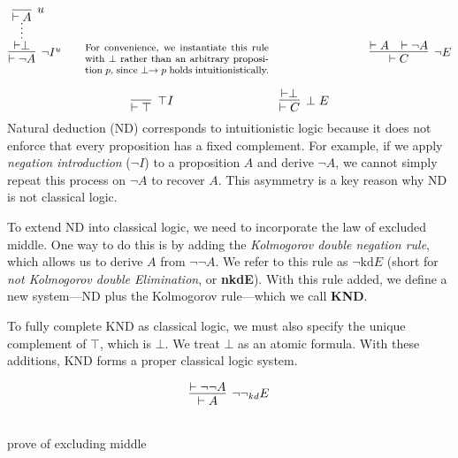 \documentclass{article}
\begin{document}
\[
\infer[\neg I^{u}]{\vdash \neg A}{
  \infer*{\vdash \perp}{\infer[u]{\vdash A}{}}
}
\qquad
\parbox{0.45\linewidth}{\footnotesize
  For convenience, we instantiate this rule with $\perp$ rather than an arbitrary proposition $p$, since $\perp \rightarrow p$ holds intuitionistically.
}
\hspace{3cm}
\infer[\neg E]{\vdash C}{
  \vdash A & \vdash \neg A
}
\]

\[
\infer[\top I]{\vdash \top}{}
\hspace{3cm}
\infer[\perp E]{\vdash C}{\vdash \perp}
\]
Natural deduction (ND) corresponds to intuitionistic logic because it does not enforce that every proposition has a fixed complement. For example, if we apply \emph{negation introduction} ($\neg I$) to a proposition $A$ and derive $\neg A$, we cannot simply repeat this process on $\neg A$ to recover $A$. This asymmetry is a key reason why ND is not classical logic.

To extend ND into classical logic, we need to incorporate the law of excluded middle. One way to do this is by adding the \emph{Kolmogorov double negation rule}, which allows us to derive $A$ from $\neg\neg A$. We refer to this rule as $\neg\text{kd}E$ (short for \emph{not Kolmogorov double Elimination}, or \textbf{nkdE}). With this rule added, we define a new system—ND plus the Kolmogorov rule—which we call \textbf{KND}.

To fully complete KND as classical logic, we must also specify the unique complement of $\top$, which is $\bot$. We treat $\bot$ as an atomic formula. With these additions, KND forms a proper classical logic system.

\[
\infer[\neg\neg_{kd}E]{\vdash A}{\vdash \neg\neg A}
\]

\begin{center}
\\
\vspace{1em}
prove of excluding middle

\end{center}
\end{document}
